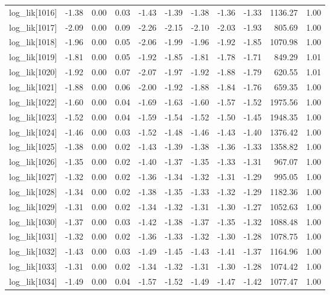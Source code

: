 \begin{table}[ht]
\begin{tabular}{rrrrrrrrrrr}
  log\_lik[1016] & -1.38 & 0.00 & 0.03 & -1.43 & -1.39 & -1.38 & -1.36 & -1.33 & 1136.27 & 1.00 \\ 
  log\_lik[1017] & -2.09 & 0.00 & 0.09 & -2.26 & -2.15 & -2.10 & -2.03 & -1.93 & 805.69 & 1.00 \\ 
  log\_lik[1018] & -1.96 & 0.00 & 0.05 & -2.06 & -1.99 & -1.96 & -1.92 & -1.85 & 1070.98 & 1.00 \\ 
  log\_lik[1019] & -1.81 & 0.00 & 0.05 & -1.92 & -1.85 & -1.81 & -1.78 & -1.71 & 849.29 & 1.01 \\ 
  log\_lik[1020] & -1.92 & 0.00 & 0.07 & -2.07 & -1.97 & -1.92 & -1.88 & -1.79 & 620.55 & 1.01 \\ 
  log\_lik[1021] & -1.88 & 0.00 & 0.06 & -2.00 & -1.92 & -1.88 & -1.84 & -1.76 & 659.35 & 1.00 \\ 
  log\_lik[1022] & -1.60 & 0.00 & 0.04 & -1.69 & -1.63 & -1.60 & -1.57 & -1.52 & 1975.56 & 1.00 \\ 
  log\_lik[1023] & -1.52 & 0.00 & 0.04 & -1.59 & -1.54 & -1.52 & -1.50 & -1.45 & 1948.35 & 1.00 \\ 
  log\_lik[1024] & -1.46 & 0.00 & 0.03 & -1.52 & -1.48 & -1.46 & -1.43 & -1.40 & 1376.42 & 1.00 \\ 
  log\_lik[1025] & -1.38 & 0.00 & 0.02 & -1.43 & -1.39 & -1.38 & -1.36 & -1.33 & 1358.82 & 1.00 \\ 
  log\_lik[1026] & -1.35 & 0.00 & 0.02 & -1.40 & -1.37 & -1.35 & -1.33 & -1.31 & 967.07 & 1.00 \\ 
  log\_lik[1027] & -1.32 & 0.00 & 0.02 & -1.36 & -1.34 & -1.32 & -1.31 & -1.29 & 995.05 & 1.00 \\ 
  log\_lik[1028] & -1.34 & 0.00 & 0.02 & -1.38 & -1.35 & -1.33 & -1.32 & -1.29 & 1182.36 & 1.00 \\ 
  log\_lik[1029] & -1.31 & 0.00 & 0.02 & -1.34 & -1.32 & -1.31 & -1.30 & -1.27 & 1052.63 & 1.00 \\ 
  log\_lik[1030] & -1.37 & 0.00 & 0.03 & -1.42 & -1.38 & -1.37 & -1.35 & -1.32 & 1088.48 & 1.00 \\ 
  log\_lik[1031] & -1.32 & 0.00 & 0.02 & -1.36 & -1.33 & -1.32 & -1.30 & -1.28 & 1078.75 & 1.00 \\ 
  log\_lik[1032] & -1.43 & 0.00 & 0.03 & -1.49 & -1.45 & -1.43 & -1.41 & -1.37 & 1164.96 & 1.00 \\ 
  log\_lik[1033] & -1.31 & 0.00 & 0.02 & -1.34 & -1.32 & -1.31 & -1.30 & -1.28 & 1074.42 & 1.00 \\ 
  log\_lik[1034] & -1.49 & 0.00 & 0.04 & -1.57 & -1.52 & -1.49 & -1.47 & -1.42 & 1077.47 & 1.00 \\ 

\end{tabular}
\end{table}
